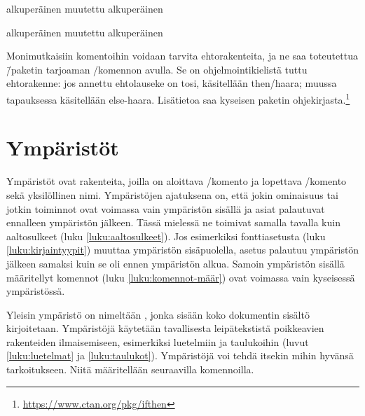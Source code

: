 \pagebreak[3]

\begin{koodilohkosis}
  \newcommand{\komento}{alkuperäinen}
  \komento
  {%
    \renewcommand{\komento}{muutettu}
    \komento
  }
  \komento
\end{koodilohkosis}

\begin{tulossis}
  alkuperäinen muutettu alkuperäinen
\end{tulossis}

Monimutkaisiin komentoihin voidaan tarvita ehtorakenteita, ja ne saa
toteutettua \=/paketin tarjoaman \-/komennon avulla. Se on ohjelmointikielistä tuttu
ehtorakenne: jos annettu ehtolauseke on tosi, käsitellään then\-/haara;
muussa tapauksessa käsitellään else-haara. Lisätietoa saa kyseisen
paketin ohjekirjasta.\footnote{\url{https://www.ctan.org/pkg/ifthen}}

\section{Ympäristöt}

Ympäristöt ovat rakenteita, joilla on aloittava \-/komento ja lopettava \-/komento sekä
yksilöllinen nimi. Ympäristöjen ajatuksena on, että jokin ominaisuus tai
jotkin toiminnot ovat voimassa vain ympäristön sisällä ja asiat
palautuvat ennalleen ympäristön jälkeen. Tässä mielessä ne toimivat
samalla tavalla kuin aaltosulkeet (luku \ref{luku:aaltosulkeet}). Jos
esimerkiksi fonttiasetusta (luku \ref{luku:kirjaintyypit}) muuttaa
ympäristön sisäpuolella, asetus palautuu ympäristön jälkeen samaksi kuin
se oli ennen ympäristön alkua. Samoin ympäristön sisällä määritellyt
komennot (luku \ref{luku:komennot-määr}) ovat voimassa vain kyseisessä
ympäristössä.

\begin{koodilohkosis}
  \begin{nimi}
  \end{nimi}
\end{koodilohkosis}

Yleisin ympäristö on nimeltään , jonka sisään koko
dokumentin sisältö kirjoitetaan. Ympäristöjä käytetään tavallisesta
leipätekstistä poikkeavien rakenteiden ilmaisemiseen, esimerkiksi
luetelmiin ja taulukoihin (luvut \ref{luku:luetelmat} ja
\ref{luku:taulukot}). Ympäristöjä voi tehdä itsekin mihin hyvänsä
tarkoitukseen. Niitä määritellään seuraavilla komennoilla.

